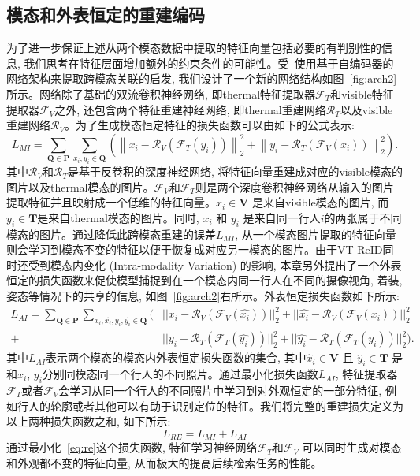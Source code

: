 \subsection{模态和外表恒定的重建编码}
为了进一步保证上述从两个模态数据中提取的特征向量包括必要的有判别性的信息, 我们思考在特征层面增加额外的约束条件的可能性。受~\cite{cao2016correlation}使用基于自编码器的网络架构来提取跨模态关联的启发, 我们设计了一个新的网络结构如图~\ref{fig:arch2}所示。网络除了基础的双流卷积神经网络, 即thermal特征提取器$\mathcal{F}_T$和visible特征提取器$\mathcal{F}_V$之外, 还包含两个特征重建神经网络, 即thermal重建网络$\mathcal{R}_T$以及visible重建网络$\mathcal{R}_V$。为了生成模态恒定特征的损失函数可以由如下的公式表示: 
\begin{equation}
  L_{M I}=\sum_{\mathbf{Q} \in \mathbf{P}} \sum_{x_i, y_i \in \mathbf{Q}}\left(\left\|x_i-\mathcal{R}_V\left(\mathcal{F}_T\left(y_i\right)\right)\right\|_2^2+\left\|y_i-\mathcal{R}_T\left(\mathcal{F}_V\left(x_i\right)\right)\right\|_2^2\right).
  \label{eq:MI_loss}
\end{equation} 
其中$\mathcal{R}_V$和$\mathcal{R}_T$是基于反卷积的深度神经网络, 将特征向量重建成对应的visible模态的图片以及thermal模态的图片。$\mathcal{F}_V$和$\mathcal{F}_T$则是两个深度卷积神经网络从输入的图片提取特征并且映射成一个低维的特征向量。$x_i \in \mathbf{V}$ 是来自visible模态的图片, 而$y_i \in \mathbf{T}$是来自thermal模态的图片。同时, $x_i$ 和 $y_i$ 是来自同一行人$i$的两张属于不同模态的图片。通过降低此跨模态重建的误差$L_{M I}$, 从一个模态图片提取的特征向量则会学习到模态不变的特征以便于恢复成对应另一模态的图片。由于VT-ReID同时还受到模态内变化 (Intra-modality Variation) 的影响, 本章另外提出了一个外表恒定的损失函数来促使模型捕捉到在一个模态内同一行人在不同的摄像视角, 着装, 姿态等情况下的共享的信息, 如图~\ref{fig:arch2}右所示。外表恒定损失函数如下所示:
\begin{equation}
  \begin{aligned}
  L_{AI} = \sum_{\mathbf{Q} \in \mathbf{P}}\sum_{x_i,\hat{x_i},y_i,\hat{y_i} \in \mathbf{Q}}(&||x_i - \mathcal{R}_V(\mathcal{F}_V(\hat{x_i}))||_2^2+
      ||\hat{x_i} - \mathcal{R}_V(\mathcal{F}_V(x_i))||_2^2  \\
      +&||y_i - \mathcal{R}_T(\mathcal{F}_T(\hat{y_i}))||_2^2+ 
      ||\hat{y_i} -\mathcal{R}_T(\mathcal{F}_T(y_i))||_2^2).
  \end{aligned}
  \label{eq:AI_loss}
  \end{equation}
  其中$L_{A I}$表示两个模态的模态内外表恒定损失函数的集合, 其中$\hat{x}_i \in \mathbf{V}$ 且 $\hat{y}_i \in \mathbf{T}$ 是和$x_i$, $y_i$分别同模态同一个行人的不同照片。通过最小化损失函数$L_{A I}$, 特征提取器 $\mathcal{F}_T$或者$\mathcal{F}_V$会学习从同一个行人的不同照片中学习到对外观恒定的一部分特征, 例如行人的轮廓或者其他可以有助于识别定位的特征。我们将完整的重建损失定义为以上两种损失函数之和, 如下所示:
  \begin{equation}
    L_{RE} = L_{MI} +L_{AI}
    \label{eq:re}
\end{equation}
通过最小化~\ref{eq:re}这个损失函数, 特征学习神经网络$\mathcal{F}_T$和$\mathcal{F}_V$ 可以同时生成对模态和外观都不变的特征向量, 从而极大的提高后续检索任务的性能。
